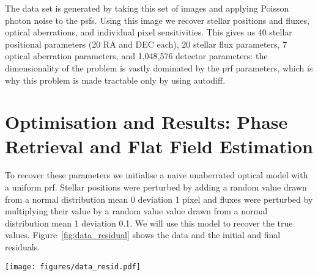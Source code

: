 \documentclass[]{spieman}
\begin{document}
The data set is generated by taking this set of images and applying Poisson photon noise to the \ac{psf}s.%
Using this image we recover stellar positions and fluxes, optical aberrations, and individual pixel sensitivities. This gives us 40 stellar positional parameters (20 RA and DEC each), 20 stellar flux parameters, 7 optical aberration parameters, and 1,048,576 detector parameters: the dimensionality of the problem is vastly dominated by the \ac{prf} parameters, which is why this problem is made tractable only by using autodiff.


\section{Optimisation and Results: Phase Retrieval and Flat Field Estimation}
\label{sec:phaseretrieval}

To recover these parameters we initialise a naive unaberrated optical model with a uniform \ac{prf}. Stellar positions were perturbed by adding a random value drawn from a normal distribution mean 0 deviation 1 pixel and fluxes were perturbed by multiplying their value by a random value value drawn from a normal distribution mean 1 deviation 0.1. We will use this model to recover the true values. Figure~\ref{fig:data_residual} shows the data and the initial and final residuals.



\begin{figure*}
    \centering
    \texttt{[image: figures/data\_resid.pdf]}
    \caption{Left: The sum of the images from which the \ac{prf} is recovered. By eye it is clearly difficult to disentangle the astrophysical information. The large number of overlapping \ac{psf}s is chosen in order to spread light across the majority of the detector so that we encode the \ac{prf} information for as much of the detector as possible. Middle: The sum of the residual of the data and the initial uncalibrated model. Clearly these residuals are large, showing that there is a large amount of calibration required. Right: This same residual after the model has been optimised. The residual values are much smaller with no discernable structure remaining. A small zoomed region is shown so that the individual pixel-level residuals can be seen.}
    \label{fig:data_residual}
\end{figure*}
\end{document}
